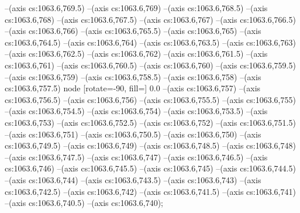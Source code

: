 --(axis cs:1063.6,769.5)
--(axis cs:1063.6,769)
--(axis cs:1063.6,768.5)
--(axis cs:1063.6,768)
--(axis cs:1063.6,767.5)
--(axis cs:1063.6,767)
--(axis cs:1063.6,766.5)
--(axis cs:1063.6,766)
--(axis cs:1063.6,765.5)
--(axis cs:1063.6,765)
--(axis cs:1063.6,764.5)
--(axis cs:1063.6,764)
--(axis cs:1063.6,763.5)
--(axis cs:1063.6,763)
--(axis cs:1063.6,762.5)
--(axis cs:1063.6,762)
--(axis cs:1063.6,761.5)
--(axis cs:1063.6,761)
--(axis cs:1063.6,760.5)
--(axis cs:1063.6,760)
--(axis cs:1063.6,759.5)
--(axis cs:1063.6,759)
--(axis cs:1063.6,758.5)
--(axis cs:1063.6,758)
--(axis cs:1063.6,757.5) node [rotate=-90, fill=\bgcol] {0.0}
--(axis cs:1063.6,757)
--(axis cs:1063.6,756.5)
--(axis cs:1063.6,756)
--(axis cs:1063.6,755.5)
--(axis cs:1063.6,755)
--(axis cs:1063.6,754.5)
--(axis cs:1063.6,754)
--(axis cs:1063.6,753.5)
--(axis cs:1063.6,753)
--(axis cs:1063.6,752.5)
--(axis cs:1063.6,752)
--(axis cs:1063.6,751.5)
--(axis cs:1063.6,751)
--(axis cs:1063.6,750.5)
--(axis cs:1063.6,750)
--(axis cs:1063.6,749.5)
--(axis cs:1063.6,749)
--(axis cs:1063.6,748.5)
--(axis cs:1063.6,748)
--(axis cs:1063.6,747.5)
--(axis cs:1063.6,747)
--(axis cs:1063.6,746.5)
--(axis cs:1063.6,746)
--(axis cs:1063.6,745.5)
--(axis cs:1063.6,745)
--(axis cs:1063.6,744.5)
--(axis cs:1063.6,744)
--(axis cs:1063.6,743.5)
--(axis cs:1063.6,743)
--(axis cs:1063.6,742.5)
--(axis cs:1063.6,742)
--(axis cs:1063.6,741.5)
--(axis cs:1063.6,741)
--(axis cs:1063.6,740.5)
--(axis cs:1063.6,740);

